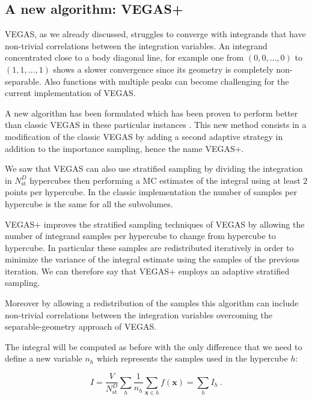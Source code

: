 \documentclass[../main/main.tex]{subfiles}
\begin{document}
\subsection{A new algorithm: VEGAS+}
\label{vegas+}
VEGAS, as we already discussed, struggles to converge with integrands that have non-trivial correlations between the integration variables. An integrand concentrated close to a body diagonal line, for example one from 
$(0,0,\dots,0)$ to $(1,1,\dots,1)$ shows a slower convergence since its geometry is completely non-separable. 
Also functions with multiple peaks can become challenging for the current implementation of VEGAS.

A new algorithm has been formulated which has been proven to perform better than classic VEGAS in these particular instances \cite{Lepage:2020tgj}.
This new method consists in a modification of the classic VEGAS by adding a second adaptive strategy in addition to the importance sampling, hence the name VEGAS+.

We saw that VEGAS can also use stratified sampling by dividing the integration in $N_\text{st}^D$ hypercubes then performing a MC estimates of 
the integral using at least $2$ points per hypercube. In the classic implementation the number of samples per hypercube is the same for all the 
subvolumes.

VEGAS+ improves the stratified sampling techniques of VEGAS by allowing the number of integrand samples per hypercube to change from hypercube to hypercube. In particular these samples are redistributed iteratively in order to minimize the variance of the integral estimate using the 
samples of the previous iteration. We can therefore say that VEGAS+ employs an adaptive stratified sampling.

Moreover by allowing a redistribution of the samples this algorithm can include non-trivial correlations between the integration variables overcoming the separable-geometry approach of VEGAS.


The integral will be computed as before with the only difference that we need to define a new variable $n_h$ which represents the samples used 
in the hypercube $h$:

\begin{equation}
	I = \frac{V}{N_\text{st}^D}\sum_h \frac{1}{n_h} \sum_{\textbf{x} \in h} f(\textbf{x})  = \sum_h I_h \ .
\end{equation}
\end{document}

